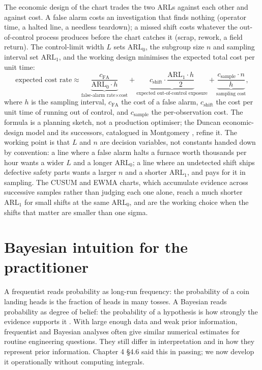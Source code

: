 The economic design of the chart trades the two ARLs against each
other and against cost. A false alarm costs an investigation that
finds nothing (operator time, a halted line, a needless teardown);
a missed shift costs whatever the out-of-control process produces
before the chart catches it (scrap, rework, a field return). The
control-limit width $L$ sets $\text{ARL}_{0}$, the subgroup size
$n$ and sampling interval set $\text{ARL}_{1}$, and the working
design minimises the expected total cost per unit time:
\[
\text{expected cost rate} \approx
\underbrace{\frac{c_{\text{FA}}}{\text{ARL}_{0} \cdot h}}
_{\text{false-alarm rate} \times \text{cost}}
+ \underbrace{c_{\text{shift}} \cdot \frac{\text{ARL}_{1} \cdot h}
{2}}_{\text{expected out-of-control exposure}}
+ \underbrace{\frac{c_{\text{sample}} \cdot n}{h}}
_{\text{sampling cost}},
\]
where $h$ is the sampling interval, $c_{\text{FA}}$ the cost of a
false alarm, $c_{\text{shift}}$ the cost per unit time of running
out of control, and $c_{\text{sample}}$ the per-observation cost.
The formula is a planning sketch, not a production optimiser; the
Duncan economic-design model and its successors, catalogued in
Montgomery \cite[ch.~10]{text:ch08-montgomery-spc-2019}, refine it.
The working point is that $L$ and $n$ are decision variables, not
constants handed down by convention: a line where a false alarm
halts a furnace worth thousands per hour wants a wider $L$ and a
longer $\text{ARL}_{0}$; a line where an undetected shift ships
defective safety parts wants a larger $n$ and a shorter
$\text{ARL}_{1}$, and pays for it in sampling. The
CUSUM and EWMA charts, which accumulate evidence across successive
samples rather than judging each one alone, reach a much shorter
$\text{ARL}_{1}$ for small shifts at the same $\text{ARL}_{0}$, and
are the working choice when the shifts that matter are smaller than
one sigma.

\section{Bayesian intuition for the practitioner}

A frequentist reads probability as long-run frequency: the
probability of a coin landing heads is the fraction of heads in many
tosses. A Bayesian reads probability as degree of belief: the
probability of a hypothesis is how strongly the evidence supports it
\cite[ch.~11]{text:wasserman2004}. With large enough data and weak
prior information, frequentist and Bayesian analyses often give
similar numerical estimates for routine engineering questions. They
still differ in interpretation and in how they represent prior
information. Chapter 4 §4.6 said this in
passing; we now develop it operationally without computing
integrals.

